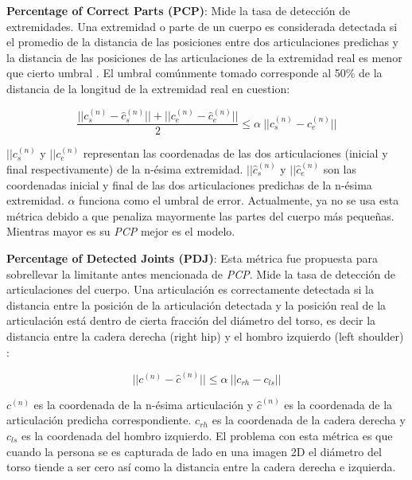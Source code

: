 \textbf{Percentage of Correct Parts (PCP)}: Mide la tasa de detección de extremidades. Una extremidad
o parte de un cuerpo es considerada detectada si el promedio de la distancia de las posiciones entre dos
articulaciones predichas y la distancia de las posiciones de las articulaciones de la extremidad real
es menor que cierto umbral \cite{4587468}. El umbral comúnmente tomado corresponde al 50\% de la distancia de la
longitud de la extremidad real en cuestion:

\begin{equation}
    \frac{||c_s^{(n)} - \hat{c}_s^{(n)}|| + ||c_e^{(n)} - \hat{c}_e^{(n)}||}{2} \le \alpha\ || c_s^{(n)} - c_e^{(n)} ||
    \label{eq:PCP}
\end{equation}

$||c_s^{(n)}$ y $||c_e^{(n)}$ representan las coordenadas de las dos articulaciones (inicial y final
respectivamente) de la n-ésima extremidad. $||\hat c_s^{(n)}$ y $||\hat c_e^{(n)}$ son las coordenadas
inicial y final de las dos articulaciones predichas de la n-ésima extremidad. $\alpha$ funciona como
el umbral de error. Actualmente, ya no se usa esta métrica debido a que penaliza mayormente las partes
del cuerpo más pequeñas. Mientras mayor es su \textit{PCP} mejor es el modelo.


\textbf{Percentage of Detected Joints (PDJ)}: Esta métrica fue propuesta para sobrellevar la
limitante antes mencionada de \textit{PCP}. Mide la tasa de detección de articulaciones del cuerpo.
Una articulación es correctamente detectada si la distancia entre la posición de la articulación
detectada y la posición real de la articulación está dentro de cierta fracción del diámetro del torso,
es decir la distancia entre la cadera derecha (right hip) y el hombro izquierdo (left shoulder)
\cite{6619315} \cite{DBLP:journals/corr/ToshevS13}:

\begin{equation}
    ||c^{(n)} - \hat{c}^{(n)}|| \le \alpha\ || c_{rh} - c_{ls} ||
    \label{eq:PDJ}
\end{equation}

$c^{(n)}$ es la coordenada de la n-ésima articulación y $\hat c^{(n)}$ es la coordenada de la
articulación predicha correspondiente. $c_{rh}$ es la coordenada de la cadera derecha y $c_{ls}$
es la coordenada del hombro izquierdo. El problema con esta métrica es que cuando la persona se es
capturada de lado en una imagen 2D el diámetro del torso tiende a ser cero así como la distancia
entre la cadera derecha e izquierda.

